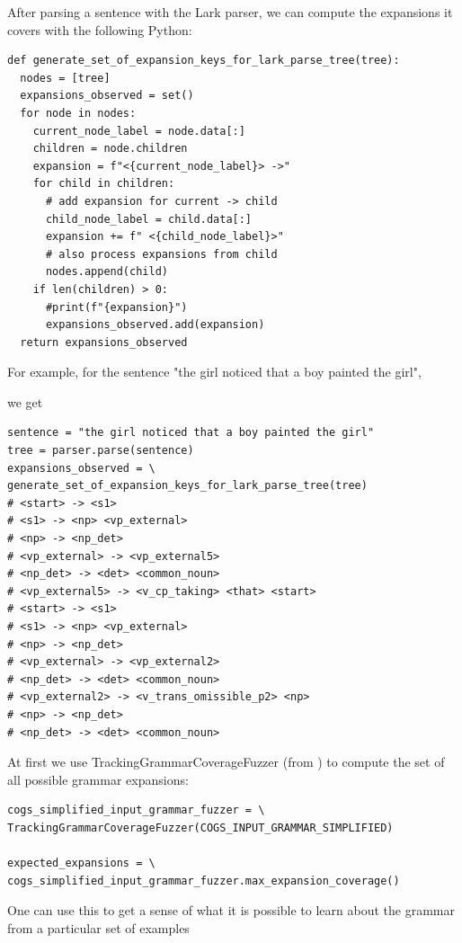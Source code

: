 \documentclass[11pt]{article}
\begin{document}
After parsing a sentence with the Lark parser, we can compute the expansions it covers with the following Python:
\begin{tiny}
\begin{verbatim}
def generate_set_of_expansion_keys_for_lark_parse_tree(tree):
  nodes = [tree]
  expansions_observed = set()
  for node in nodes:
    current_node_label = node.data[:]
    children = node.children
    expansion = f"<{current_node_label}> ->"
    for child in children:
      # add expansion for current -> child
      child_node_label = child.data[:]
      expansion += f" <{child_node_label}>"
      # also process expansions from child
      nodes.append(child)
    if len(children) > 0:
      #print(f"{expansion}")
      expansions_observed.add(expansion)
  return expansions_observed
\end{verbatim}
\end{tiny}

For example, for the sentence "the girl noticed that a boy painted the girl",

we get
\begin{tiny}
\begin{verbatim}
sentence = "the girl noticed that a boy painted the girl"
tree = parser.parse(sentence)
expansions_observed = \
generate_set_of_expansion_keys_for_lark_parse_tree(tree)
# <start> -> <s1>
# <s1> -> <np> <vp_external>
# <np> -> <np_det>
# <vp_external> -> <vp_external5>
# <np_det> -> <det> <common_noun>
# <vp_external5> -> <v_cp_taking> <that> <start>
# <start> -> <s1>
# <s1> -> <np> <vp_external>
# <np> -> <np_det>
# <vp_external> -> <vp_external2>
# <np_det> -> <det> <common_noun>
# <vp_external2> -> <v_trans_omissible_p2> <np>
# <np> -> <np_det>
# <np_det> -> <det> <common_noun>
\end{verbatim}
\end{tiny}

At first we use TrackingGrammarCoverageFuzzer (from \cite{fuzzingbook2023:GrammarCoverageFuzzer}) to compute the set of all possible grammar expansions:
\begin{tiny}
\begin{verbatim}
cogs_simplified_input_grammar_fuzzer = \
TrackingGrammarCoverageFuzzer(COGS_INPUT_GRAMMAR_SIMPLIFIED)

expected_expansions = \
cogs_simplified_input_grammar_fuzzer.max_expansion_coverage()
\end{verbatim}
\end{tiny}

One can use this to get a sense of what it is possible to learn about the grammar from a particular set of examples
\end{document}
